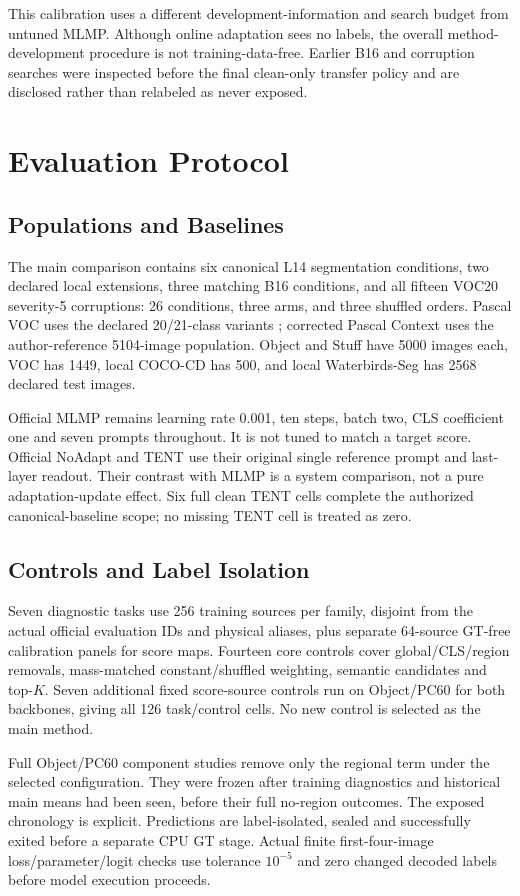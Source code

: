 \documentclass[10pt,twocolumn]{article}
\begin{document}
This calibration uses a different development-information and search budget
from untuned MLMP. Although online adaptation sees no labels, the overall
method-development procedure is not training-data-free. Earlier B16 and
corruption searches were inspected before the final clean-only transfer
policy and are disclosed rather than relabeled as never exposed.

\section{Evaluation Protocol}
\subsection{Populations and Baselines}
The main comparison contains six canonical L14 segmentation conditions,
two declared local extensions, three matching B16 conditions, and all fifteen
VOC20 severity-5 corruptions: 26 conditions, three arms, and three shuffled
orders. Pascal VOC uses the declared 20/21-class variants
\citep{everingham2015pascal}; corrected Pascal Context uses the author-reference
5104-image population. Object and Stuff have 5000 images each, VOC has 1449,
local COCO-CD has 500, and local Waterbirds-Seg has 2568 declared test images.

Official MLMP remains learning rate 0.001, ten steps, batch two, CLS coefficient
one and seven prompts throughout. It is not tuned to match a target score.
Official NoAdapt and TENT use their original single reference prompt and
last-layer readout. Their contrast with MLMP is a system comparison, not a
pure adaptation-update effect. Six full clean TENT cells complete the
authorized canonical-baseline scope; no missing TENT cell is treated as zero.

\subsection{Controls and Label Isolation}
Seven diagnostic tasks use 256 training sources per family, disjoint from
the actual official evaluation IDs and physical aliases, plus separate
64-source GT-free calibration panels for score maps. Fourteen core controls
cover global/CLS/region removals, mass-matched constant/shuffled weighting,
semantic candidates and top-$K$. Seven additional fixed score-source controls
run on Object/PC60 for both backbones, giving all 126 task/control cells.
No new control is selected as the main method.

Full Object/PC60 component studies remove only the regional term under the
selected configuration. They were frozen after training diagnostics and
historical main means had been seen, before their full no-region outcomes.
The exposed chronology is explicit. Predictions are label-isolated, sealed
and successfully exited before a separate CPU GT stage. Actual finite
first-four-image loss/parameter/logit checks use tolerance $10^{-5}$ and
zero changed decoded labels before model execution proceeds.
\end{document}
